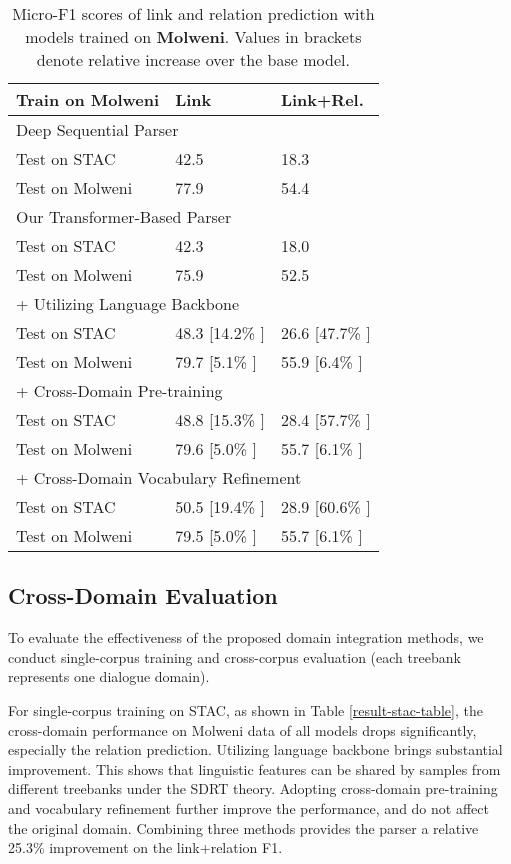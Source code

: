 \documentclass[11pt]{article}
\begin{document}
\begin{table}[t!]
\linespread{1.0}
\centering
\small
\begin{tabular}{p{2.6cm}p{1.9cm}<{\centering}p{1.9cm}<{\centering}}
\toprule
\textbf{Train on Molweni}  & \textbf{Link} & \textbf{Link+Rel.} \\
\midrule
\multicolumn{3}{l}{Deep Sequential Parser \cite{shi2019deepSeqParser}} \\
Test on STAC & 42.5 & 18.3 \\
Test on Molweni & 77.9 & 54.4 \\
\midrule
\midrule
\multicolumn{3}{l}{Our Transformer-Based Parser} \\
Test on STAC & 42.3 & 18.0 \\
Test on Molweni & 75.9 & 52.5 \\
\midrule
\multicolumn{3}{l}{+ Utilizing Language Backbone} \\
Test on STAC & 48.3 [14.2\% ] & 26.6 [47.7\% ] \\
Test on Molweni & 79.7 [5.1\% ] & 55.9 [6.4\% ] \\
\midrule
\multicolumn{3}{l}{+ Cross-Domain Pre-training} \\
Test on STAC & 48.8 [15.3\% ] & 28.4 [57.7\% ] \\
Test on Molweni & 79.6 [5.0\% ] & 55.7 [6.1\% ] \\
\midrule
\multicolumn{3}{l}{+ Cross-Domain Vocabulary Refinement} \\
Test on STAC & 50.5 [19.4\% ] & 28.9 [60.6\% ] \\
Test on Molweni & 79.5 [5.0\% ] &  55.7 [6.1\% ] \\
\bottomrule
\end{tabular}
\caption{\label{result-mol-table} Micro-F1 scores of link and relation prediction with models trained on \textbf{Molweni}. Values in brackets denote relative increase over the base model.}
\vspace{-0.2cm}
\end{table}

\subsection{Cross-Domain Evaluation}
To evaluate the effectiveness of the proposed domain integration methods, we conduct single-corpus training and cross-corpus evaluation (each treebank represents one dialogue domain).

For single-corpus training on STAC, as shown in Table \ref{result-stac-table}, the cross-domain performance on Molweni data of all models drops significantly, especially the relation prediction. Utilizing language backbone brings substantial improvement. This shows that linguistic features can be shared by samples from different treebanks under the SDRT theory. Adopting cross-domain pre-training and vocabulary refinement further improve the performance, and do not affect the original domain. Combining three methods provides the parser a relative 25.3\% improvement on the link+relation F1.
\end{document}
